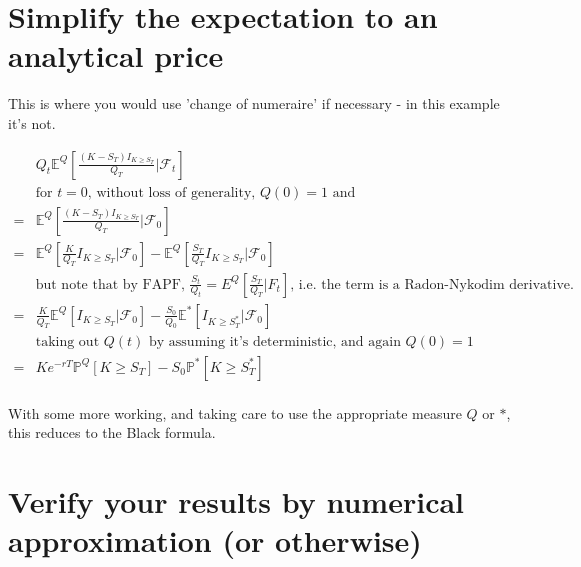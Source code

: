 \documentclass[a4paper]{article}
\begin{document}
\section{Simplify the expectation to an analytical price}

This is where you would use 'change of numeraire' if necessary - in this example it's not.

\begin{align*}
& Q_t \mathbb{E}^Q[ \frac{  (K - S_T) I_{K \geq S_T} } { Q_T } | \mathcal{F}_t ] \\
& \text{for $t = 0$, without loss of generality, $Q(0) = 1$ and } \\
= & \mathbb{E}^Q[ \frac{  (K - S_T) I_{K \geq S_T} } { Q_T } | \mathcal{F}_0 ] \\
= & \mathbb{E}^Q[ \frac{K} {Q_T} I_{K \geq S_T} | \mathcal{F}_0 ] - \mathbb{E}^Q[ \frac{S_T} {Q_T} I_{K \geq S_T} | \mathcal{F}_0 ] \\
& \text{but note that by FAPF, $\frac{S_t}{Q_t} = E^Q[\frac{S_T}{Q_T} | F_t]$, i.e. the term is a Radon-Nykodim derivative. } \\
= & \frac{K} {Q_T} \mathbb{E}^Q[  I_{K \geq S_T} | \mathcal{F}_0 ] - \frac{S_0} {Q_0} \mathbb{E}^{*}[  I_{K \geq S^*_T} | \mathcal{F}_0 ] \\
& \text{taking out $Q(t)$ by assuming it's deterministic, and again $Q(0) = 1$} \\
= & K e^{-rT} \mathbb{P}^Q[K \geq S_T] - S_0 \mathbb{P}^{*}[K \geq S^*_T] \\
\end{align*}

With some more working, and taking care to use the appropriate measure $Q$ or $*$, this reduces to the Black formula.

\section{Verify your results by numerical approximation (or otherwise)}
\end{document}
